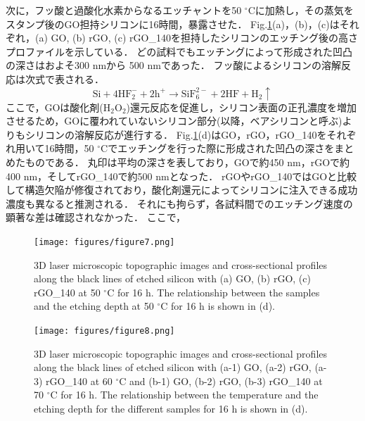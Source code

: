 \documentclass[platex,dvipdfmx]{jlreq}			%
\begin{document}
次に，フッ酸と過酸化水素からなるエッチャントを50 ${}^\circ$Cに加熱し，その蒸気をスタンプ後のGO担持シリコンに16時間，暴露させた．
Fig.\ref{fig:Laser}(a)，(b)，(c)はそれぞれ，(a) GO, (b) rGO, (c) rGO\_140を担持したシリコンのエッチング後の高さプロファイルを示している．
どの試料でもエッチングによって形成された凹凸の深さはおよそ300 nmから 500 nmであった．
フッ酸によるシリコンの溶解反応は次式で表される．
\begin{displaymath}
    \mathrm{Si + 4HF_2^- + 2h^+ \rightarrow SiF_6^{2-} + 2HF + H_2 \uparrow}
\end{displaymath}
ここで，GOは酸化剤(H$_2$O$_2$)還元反応を促進し，シリコン表面の正孔濃度を増加させるため，GOに覆われていないシリコン部分(以降，ベアシリコンと呼ぶ)よりもシリコンの溶解反応が進行する．
Fig.\ref{fig:Laser}(d)はGO，rGO，rGO\_140をそれぞれ用いて16時間，50 ${}^\circ$Cでエッチングを行った際に形成された凹凸の深さをまとめたものである．
丸印は平均の深さを表しており，GOで約450 nm，rGOで約400 nm，そしてrGO\_140で約500 nmとなった．
rGOやrGO\_140ではGOと比較して構造欠陥が修復されており，酸化剤還元によってシリコンに注入できる成功濃度も異なると推測される．
それにも拘らず，各試料間でのエッチング速度の顕著な差は確認されなかった．
ここで，





\begin{figure}[H]
    \centering
    \texttt{[image: figures/figure7.png]}
    \caption{3D laser microscopic topographic images and cross-sectional profiles along the black lines of etched silicon with (a) GO, (b) rGO, (c) rGO\_140 at 50 ${}^\circ$C for 16 h. The relationship between the samples and the etching depth at 50 ${}^\circ$C for 16 h is shown in (d).}
    \label{fig:Laser}
\end{figure}

\begin{figure}[H]
    \centering
    \texttt{[image: figures/figure8.png]}
    \caption{3D laser microscopic topographic images and cross-sectional profiles along the black lines of etched silicon with (a-1) GO, (a-2) rGO, (a-3) rGO\_140 at 60 ${}^\circ$C and (b-1) GO, (b-2) rGO, (b-3) rGO\_140 at 70 ${}^\circ$C for 16 h. The relationship between the temperature and the etching depth for the different samples for 16 h is shown in (d).}
    \label{fig:Etching_temp}
\end{figure}
\end{document}

